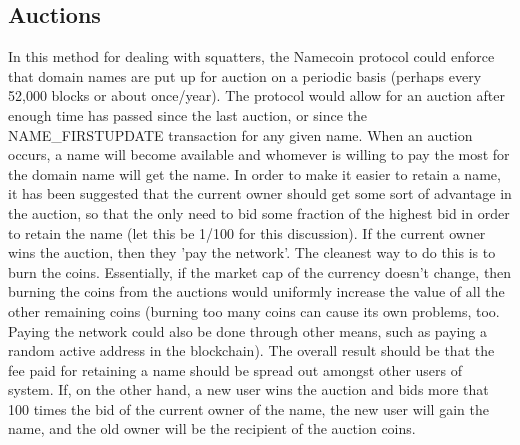 \subsection{Auctions}
    In this method for dealing with squatters, the Namecoin protocol could enforce that domain names are put up for auction on a periodic basis (perhaps every 52,000 blocks or about once/year). The protocol would allow for an auction after enough time has passed since the last auction, or since the NAME\_FIRSTUPDATE transaction for any given name. When an auction occurs, a name will become available and whomever is willing to pay the most for the domain name will get the name. In order to make it easier to retain a name, it has been suggested that the current owner should get some sort of advantage in the auction, so that the only need to bid some fraction of the highest bid in order to retain the name (let this be 1/100 for this discussion). If the current owner wins the auction, then they 'pay the network'. The cleanest way to do this is to burn the coins. Essentially, if the market cap of the currency doesn't change, then burning the coins from the auctions would uniformly increase the value of all the other remaining coins (burning too many coins can cause its own problems, too. Paying the network could also be done through other means, such as paying a random active address in the blockchain). The overall result should be that the fee paid for retaining a name should be spread out amongst other users of system. If, on the other hand, a new user wins the auction and bids more that 100 times the bid of the current owner of the name, the new user will gain the name, and the old owner will be the recipient of the auction coins. 
